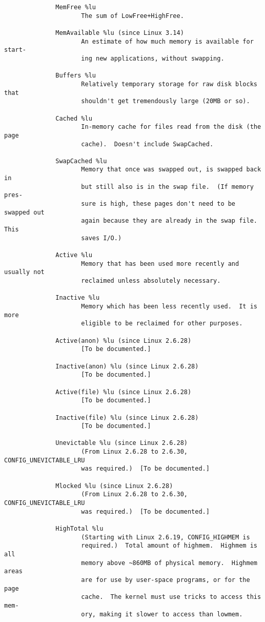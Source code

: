 \documentclass[]{article}
\begin{document}
\begin{verbatim}
              MemFree %lu
                     The sum of LowFree+HighFree.

              MemAvailable %lu (since Linux 3.14)
                     An estimate of how much memory is available for start‐
                     ing new applications, without swapping.

              Buffers %lu
                     Relatively temporary storage for raw disk blocks that
                     shouldn't get tremendously large (20MB or so).

              Cached %lu
                     In-memory cache for files read from the disk (the page
                     cache).  Doesn't include SwapCached.

              SwapCached %lu
                     Memory that once was swapped out, is swapped back in
                     but still also is in the swap file.  (If memory pres‐
                     sure is high, these pages don't need to be swapped out
                     again because they are already in the swap file.  This
                     saves I/O.)

              Active %lu
                     Memory that has been used more recently and usually not
                     reclaimed unless absolutely necessary.

              Inactive %lu
                     Memory which has been less recently used.  It is more
                     eligible to be reclaimed for other purposes.

              Active(anon) %lu (since Linux 2.6.28)
                     [To be documented.]

              Inactive(anon) %lu (since Linux 2.6.28)
                     [To be documented.]

              Active(file) %lu (since Linux 2.6.28)
                     [To be documented.]

              Inactive(file) %lu (since Linux 2.6.28)
                     [To be documented.]

              Unevictable %lu (since Linux 2.6.28)
                     (From Linux 2.6.28 to 2.6.30, CONFIG_UNEVICTABLE_LRU
                     was required.)  [To be documented.]

              Mlocked %lu (since Linux 2.6.28)
                     (From Linux 2.6.28 to 2.6.30, CONFIG_UNEVICTABLE_LRU
                     was required.)  [To be documented.]

              HighTotal %lu
                     (Starting with Linux 2.6.19, CONFIG_HIGHMEM is
                     required.)  Total amount of highmem.  Highmem is all
                     memory above ~860MB of physical memory.  Highmem areas
                     are for use by user-space programs, or for the page
                     cache.  The kernel must use tricks to access this mem‐
                     ory, making it slower to access than lowmem.


\end{verbatim}
\end{document}
